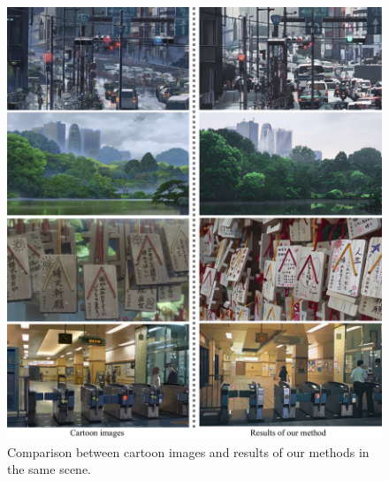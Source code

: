 \documentclass[10pt,twocolumn,letterpaper]{article}
\begin{document}
\begin{figure}[htb]
\centering
\includegraphics[width=\linewidth]{figures/compare2.pdf}
\caption{Comparison between cartoon images and results of our methods in the same scene.}
\label{fig:compare2}
\end{figure}
\end{document}
